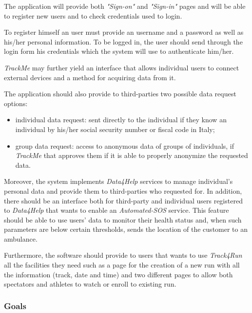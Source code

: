 \documentclass[a4paper]{article}
\begin{document}
        The application will provide both \textit{"Sign-on"} and \textit{"Sign-in"} pages and will be able to register new users and to check credentials used to login.
        
        To register himself an user must provide an username and a password as well as his/her personal information. To be logged in, the user should send through the login form his credentials which the system will use to authenticate him/her.
        
        \textit{TrackMe} may further yield an interface that allows individual users to connect external devices and a method for acquiring data from it.
        
        The application should also provide to third-parties two possible data request options:
        \begin{itemize}
            \item individual data request: sent directly to the individual if they know an  individual by his/her social security number or fiscal code in Italy;
            \item group data request: access  to  anonymous  data  of  groups  of  individuals, if \textit{TrackMe}  that  approves  them  if  it  is  able  to  properly  anonymize  the  requested  data.
        \end{itemize}
        
        Moreover, the system implements \textit{Data4Help} services to manage individual's personal data and provide them to third-parties who requested for. In addition, there should be an interface both for third-party and individual users registered to \textit{Data4Help} that wants to enable an \textit{Automated-SOS} service. This feature should be able to use users' data to monitor their health status and, when such parameters are below certain thresholds, sends the location of the customer to an ambulance.
        
        Furthermore, the software should provide to users that wants to use \textit{Track4Run} all the facilities they need such as a page for the creation of a new run with all the information (track, date and time) and two different pages to allow both spectators and athletes to watch or enroll to existing run.
        
        \subsubsection{Goals}
        
\end{document}
